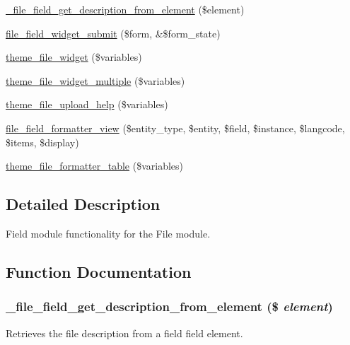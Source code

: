 \begin{DoxyCompactItemize}
\hyperlink{file_8field_8inc_a55abbdfc11a44e1f8a171060d4f5d888}{\_\-file\_\-field\_\-get\_\-description\_\-from\_\-element} (\$element)
\item 
\hyperlink{file_8field_8inc_a058cf6245fc80b300ae30152fb98f33f}{file\_\-field\_\-widget\_\-submit} (\$form, \&\$form\_\-state)
\item 
\hyperlink{group__themeable_ga9055faf2be0e1a9f7c75a5f981a4efa7}{theme\_\-file\_\-widget} (\$variables)
\item 
\hyperlink{group__themeable_ga56ddebb122d3e6e5a16783ccbf27fbfc}{theme\_\-file\_\-widget\_\-multiple} (\$variables)
\item 
\hyperlink{group__themeable_gaddc2762286376b44aa1a4ca0ce9e1a6e}{theme\_\-file\_\-upload\_\-help} (\$variables)
\item 
\hyperlink{file_8field_8inc_a91718368e9756a53ea08415f8f933901}{file\_\-field\_\-formatter\_\-view} (\$entity\_\-type, \$entity, \$field, \$instance, \$langcode, \$items, \$display)
\item 
\hyperlink{group__themeable_ga4c35503833fe7ebd0d012e2da75fd4e1}{theme\_\-file\_\-formatter\_\-table} (\$variables)
\end{DoxyCompactItemize}


\subsection{Detailed Description}
Field module functionality for the File module. 

\subsection{Function Documentation}
\hypertarget{file_8field_8inc_a55abbdfc11a44e1f8a171060d4f5d888}{
\subsubsection[{\_\-file\_\-field\_\-get\_\-description\_\-from\_\-element}]{\setlength{\rightskip}{0pt plus 5cm}\_\-file\_\-field\_\-get\_\-description\_\-from\_\-element (\$ {\em element})}}
\label{file_8field_8inc_a55abbdfc11a44e1f8a171060d4f5d888}
Retrieves the file description from a field field element.

